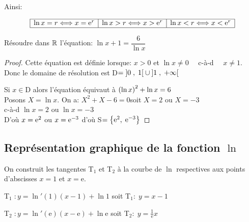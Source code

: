 Ainsi:


$$\begin{array}{|c|c|c|}
\hline
 \ln x = r  \Longleftrightarrow x = \mathrm{e}^{r} &
 \ln x  > r \Longleftrightarrow x >\mathrm{e}^{r} &
 \ln x  < r\Longleftrightarrow x <   \mathrm{e}^{r} \\
\hline
\end{array}$$

\begin{exercice}

Résoudre dans $ \mathbb{R} $  l'équation:\; $ \ln x+1=\dfrac{6}{\ln x} $
\end{exercice}
\begin{proof}
Cette équation est définie lorsque:\; $ x>  0$\;  et\;  $\ln x \neq 0 \quad$ \; c-à-d \; $\quad x\neq 1. $ \\

 Donc le domaine de résolution est  \;D$ =\left]0 \;,\; 1\right[ \cup \left]1 \;,\; +\infty\right[ $

Si $ x \in $D alors  l'équation équivaut à  $ \left(\ln x\right)^{2}+ \ln x= 6 $\\

Posons \quad $  X= \ln x $.\; On a:\;  $ X^{2}+X-6=0$\quad  soit \;  $X=2 $ \;ou \; $X=-3 $\\

c-à-d \;  $ \ln x=2 $\; ou \; $ \ln x=-3 $\\

D'où\; $x=\mathrm{e}^{2} $   \; ou \; $x= \mathrm{e}^{-3} $ \;  d'où \; S$ =\left\{\mathrm{e}^{2},\;\mathrm{e}^{-3} \right\} $

\end{proof}

\subsection*{Représentation graphique de la fonction $ \ln $}
On construit les tangentes  T$ _{1} $   et T$ _{2} $ à la courbe de $ \ln $   respectives  aux points  d'abscisses $ x=1$ et $x= \mathrm{e} $.

 T$ _{1} \;: y= \ln'(1)(x-1) +\ln1$ \; soit \; T$ _{1}:\;y=x-1 $ 
 
  T$ _{2} \;: y= \ln'(\mathrm{e})(x-\mathrm{e}) +\ln \mathrm{e}$ \; soit \; T$ _{2}:\;y=\tfrac{1}{\mathrm{e}}x $ 
  \begin{center}
\end{center}


